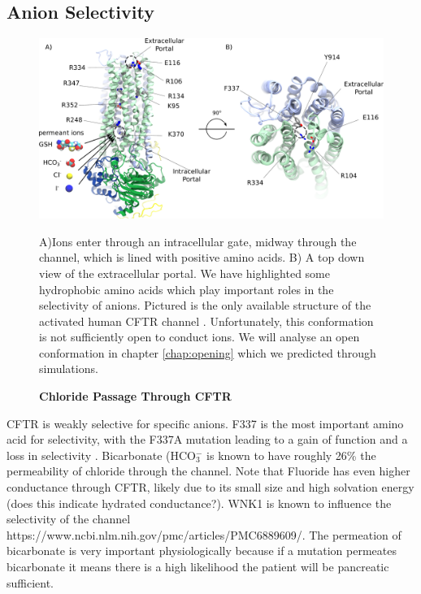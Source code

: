 \subsection {Anion Selectivity}

\begin{figure}
	\begin{center}
	\includegraphics[width=\textwidth]{figures/chloride_passage_figure.pdf}
	\end{center}
	\label{chloride_passage}
	\captionsetup{singlelinecheck = false, justification=raggedright}
	\caption[Chlrodie Passage through CFTR] {\textbf{Chloride Passage Through CFTR}}{A)Ions enter through an intracellular gate, midway through the channel, which is lined with positive amino acids. B) A top down view of the extracellular portal. We have highlighted some hydrophobic amino acids which play important roles in the selectivity of anions. Pictured is the only available structure of the activated human CFTR channel \cite{zhang2018}. Unfortunately, this conformation is not sufficiently open to conduct ions. We will analyse an open conformation in chapter \ref{chap:opening} which we predicted through simulations.} 

\end{figure}
CFTR is weakly selective for specific anions. F337 is the most important amino acid for selectivity, with the F337A mutation leading to a gain of function and a loss in selectivity \cite{wei2016}. Bicarbonate (HCO$_3^-$ is known to have roughly 26\% the permeability of chloride through the channel. Note that Fluoride has even higher conductance through CFTR, likely due to its small size and high solvation energy (does this indicate hydrated conductance?). WNK1 is known to influence the selectivity of the channel https://www.ncbi.nlm.nih.gov/pmc/articles/PMC6889609/. The permeation of bicarbonate is very important physiologically because if a mutation permeates bicarbonate it means there is a high likelihood the patient will be pancreatic sufficient. 

